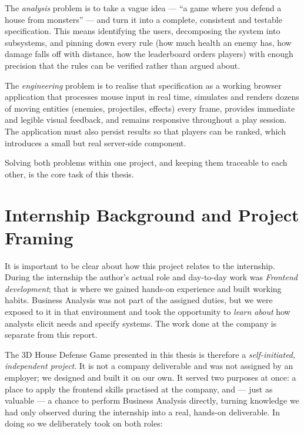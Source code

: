 \documentclass[12pt,a4paper]{report}
\begin{document}
The \emph{analysis} problem is to take a vague idea --- ``a game where you
defend a house from monsters'' --- and turn it into a complete, consistent and
testable specification. This means identifying the users, decomposing the
system into subsystems, and pinning down every rule (how much health an enemy
has, how damage falls off with distance, how the leaderboard orders players)
with enough precision that the rules can be verified rather than argued about.

The \emph{engineering} problem is to realise that specification as a working
browser application that processes mouse input in real time, simulates and
renders dozens of moving entities (enemies, projectiles, effects) every frame,
provides immediate and legible visual feedback, and remains responsive
throughout a play session. The application must also persist results so that
players can be ranked, which introduces a small but real server-side component.

Solving both problems within one project, and keeping them traceable to each
other, is the core task of this thesis.

\section{Internship Background and Project Framing}

It is important to be clear about how this project relates to the internship.
During the internship the author's actual role and day-to-day work was
\emph{Frontend development}; that is where we gained hands-on experience and
built working habits. Business Analysis was not part of the assigned duties, but
we were exposed to it in that environment and took the opportunity to
\emph{learn about} how analysts elicit needs and specify systems. The work done
at the company is separate from this report.

The 3D House Defense Game presented in this thesis is therefore a
\emph{self-initiated, independent project}. It is not a company deliverable and
was not assigned by an employer; we designed and built it on our own. It served
two purposes at once: a place to apply the frontend skills practised at the
company, and --- just as valuable --- a chance to perform Business Analysis
directly, turning knowledge we had only observed during the internship into a
real, hands-on deliverable. In doing so we deliberately took on both roles:
\end{document}
